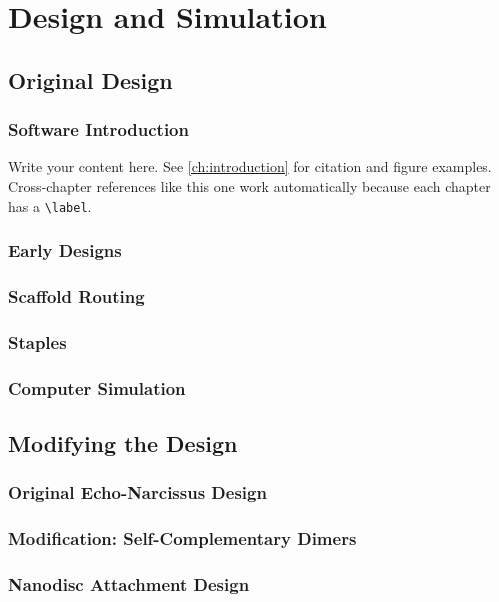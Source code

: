 
\chapter{Design and Simulation}
\label{ch:design-and-simulation}


\section{Original Design}
\label{sec:original-design}

\subsection{Software Introduction}
\label{subsec:software-intro}

Write your content here.  See \autoref{ch:introduction} for citation and figure
examples.  Cross-chapter references like this one work automatically because
each chapter has a \texttt{\textbackslash label}.

\subsection{Early Designs}
\label{subsec:early-designs}

\subsection{Scaffold Routing}
\label{subsec:scaffold-routing}

\subsection{Staples}
\label{subsec:staples}

\subsection{Computer Simulation}
\label{subsec:design-simulation}


\section{Modifying the Design}
\label{sec:modifying-design}

\subsection{Original Echo-Narcissus Design}
\label{subsec:echo-narcissus}

\subsection{Modification: Self-Complementary Dimers}
\label{subsec:self-complementary-dimers}

\subsection{Nanodisc Attachment Design}
\label{subsec:nanodisc-attachment-design}
